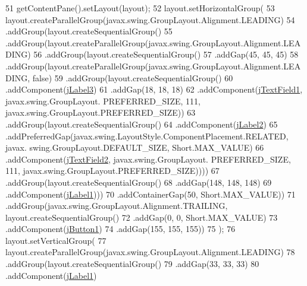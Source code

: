 \begin{DoxyCode}
51         getContentPane().setLayout(layout);
52         layout.setHorizontalGroup(
53             layout.createParallelGroup(javax.swing.GroupLayout.Alignment.LEADING)
54             .addGroup(layout.createSequentialGroup()
55                 .addGroup(layout.createParallelGroup(javax.swing.GroupLayout.Alignment.LEADING)
56                     .addGroup(layout.createSequentialGroup()
57                         .addGap(45, 45, 45)
58                         .addGroup(layout.createParallelGroup(javax.swing.GroupLayout.Alignment.LEADING, \textcolor{keyword}{
      false})
59                             .addGroup(layout.createSequentialGroup()
60                                 .addComponent(\mbox{\hyperlink{classsoftware_1_1login_a35cc02634a69b5d3cf15f9ad2a4892dd}{jLabel3}})
61                                 .addGap(18, 18, 18)
62                                 .addComponent(\mbox{\hyperlink{classsoftware_1_1login_a690b80a1950fed323a4be5b825d60bce}{jTextField1}}, javax.swing.GroupLayout.
      PREFERRED\_SIZE, 111, javax.swing.GroupLayout.PREFERRED\_SIZE))
63                             .addGroup(layout.createSequentialGroup()
64                                 .addComponent(\mbox{\hyperlink{classsoftware_1_1login_a58160102e1811efcd53ef135c19909a5}{jLabel2}})
65                                 .addPreferredGap(javax.swing.LayoutStyle.ComponentPlacement.RELATED, javax.
      swing.GroupLayout.DEFAULT\_SIZE, Short.MAX\_VALUE)
66                                 .addComponent(\mbox{\hyperlink{classsoftware_1_1login_a4e1d1476f2bc1aed6116d7ffb239eb52}{jTextField2}}, javax.swing.GroupLayout.
      PREFERRED\_SIZE, 111, javax.swing.GroupLayout.PREFERRED\_SIZE))))
67                     .addGroup(layout.createSequentialGroup()
68                         .addGap(148, 148, 148)
69                         .addComponent(\mbox{\hyperlink{classsoftware_1_1login_ad0f5337669524109d8aa4bdb121a2b6b}{jLabel1}})))
70                 .addContainerGap(50, Short.MAX\_VALUE))
71             .addGroup(javax.swing.GroupLayout.Alignment.TRAILING, layout.createSequentialGroup()
72                 .addGap(0, 0, Short.MAX\_VALUE)
73                 .addComponent(\mbox{\hyperlink{classsoftware_1_1login_a4dd489e2e09616f63d7fcbe94b4a6cd5}{jButton1}})
74                 .addGap(155, 155, 155))
75         );
76         layout.setVerticalGroup(
77             layout.createParallelGroup(javax.swing.GroupLayout.Alignment.LEADING)
78             .addGroup(layout.createSequentialGroup()
79                 .addGap(33, 33, 33)
80                 .addComponent(\mbox{\hyperlink{classsoftware_1_1login_ad0f5337669524109d8aa4bdb121a2b6b}{jLabel1}})

\end{DoxyCode}
